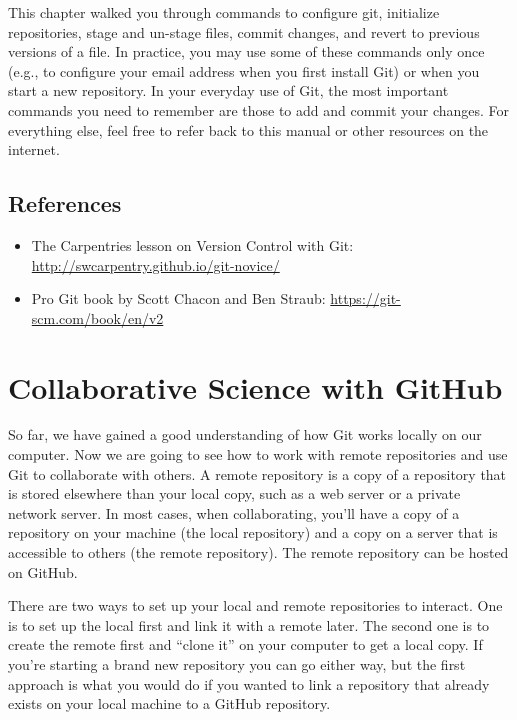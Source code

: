 \documentclass[
]{book}
\providecommand{\tightlist}{%
  \setlength{\itemsep}{0pt}\setlength{\parskip}{0pt}}
\begin{document}
This chapter walked you through commands to configure git, initialize repositories, stage and un-stage files, commit changes, and revert to previous versions of a file. In practice, you may use some of these commands only once (e.g., to configure your email address when you first install Git) or when you start a new repository. In your everyday use of Git, the most important commands you need to remember are those to add and commit your changes. For everything else, feel free to refer back to this manual or other resources on the internet.

\hypertarget{references-1}{%
\section{References}\label{references-1}}

\begin{itemize}
\tightlist
\item
  The Carpentries lesson on Version Control with Git: \url{http://swcarpentry.github.io/git-novice/}
\item
  Pro Git book by Scott Chacon and Ben Straub: \url{https://git-scm.com/book/en/v2}
\end{itemize}

\hypertarget{github}{%
\chapter{Collaborative Science with GitHub}\label{github}}

So far, we have gained a good understanding of how Git works locally on our computer. Now we are going to see how to work with remote repositories and use Git to collaborate with others. A remote repository is a copy of a repository that is stored elsewhere than your local copy, such as a web server or a private network server. In most cases, when collaborating, you'll have a copy of a repository on your machine (the local repository) and a copy on a server that is accessible to others (the remote repository). The remote repository can be hosted on GitHub.

There are two ways to set up your local and remote repositories to interact. One is to set up the local first and link it with a remote later. The second one is to create the remote first and ``clone it'' on your computer to get a local copy. If you're starting a brand new repository you can go either way, but the first approach is what you would do if you wanted to link a repository that already exists on your local machine to a GitHub repository.
\end{document}
